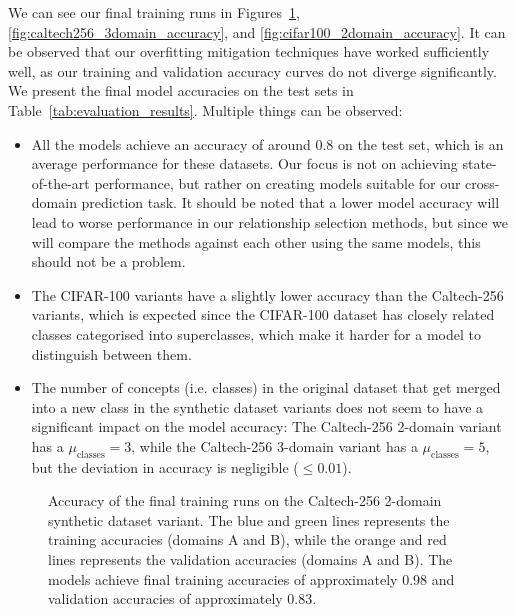 We can see our final training runs in Figures~\ref{fig:caltech256_2domain_accuracy}, \ref{fig:caltech256_3domain_accuracy}, and \ref{fig:cifar100_2domain_accuracy}.
It can be observed that our overfitting mitigation techniques have worked sufficiently well,
as our training and validation accuracy curves do not diverge significantly.
We present the final model accuracies on the test sets in Table~\ref{tab:evaluation_results}.
Multiple things can be observed:
\begin{itemize}
      \item All the models achieve an accuracy of around 0.8 on the test set,
            which is an average performance for these datasets.
            Our focus is not on achieving state-of-the-art performance,
            but rather on creating models suitable for our cross-domain prediction task.
            It should be noted that a lower model accuracy will lead to worse performance
            in our relationship selection methods, but since we will compare the methods against each other
            using the same models, this should not be a problem.
      \item The CIFAR-100 variants have a slightly lower accuracy than the Caltech-256 variants,
            which is expected since the CIFAR-100 dataset has closely related classes
            categorised into superclasses, which make it harder for a model to distinguish between them.
      \item The number of concepts (i.e. classes) in the original dataset that get merged
            into a new class in the synthetic dataset variants does not seem to have a significant impact
            on the model accuracy: The Caltech-256 2-domain variant has a $\mu_{\text{classes}}=3$,
            while the Caltech-256 3-domain variant has a $\mu_{\text{classes}}=5$,
            but the deviation in accuracy is negligible ($\leq 0.01$).
\end{itemize}

\begin{figure}[ht]
      \centering
      \scalebox{0.6}{}
      \caption{Accuracy of the final training runs on the Caltech-256 2-domain synthetic dataset variant.
            The blue and green lines represents the training accuracies (domains A and B),
            while the orange and red lines represents the validation accuracies (domains A and B).
            The models achieve final training accuracies of approximately 0.98 and validation accuracies of approximately 0.83.}
      \label{fig:caltech256_2domain_accuracy}
\end{figure}

